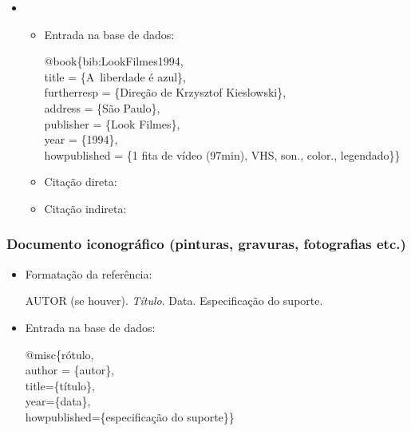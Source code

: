 \documentclass[a4paper,12pt,oneside,onecolumn]{uerj}
\newcommand{\formato}[1]{\begin{flushleft}{#1}\end{flushleft}}
\begin{document}
\begin{itemize}[label={Ex.:},leftmargin=\parindent,parsep=0pt,itemsep=0pt]
  \item     \formato{\citetext{bib:LookFilmes1994}}

  \begin{itemize}[leftmargin=*,parsep=0pt,itemsep=0pt]
    \item Entrada na base de dados:

    \formato{
      @book\{bib:LookFilmes1994,\\
      title = \{A~liberdade {\'e} azul\},\\
      furtherresp = \{Dire{\c c}{\~a}o de Krzysztof Kieslowski\},\\
      address = \{S{\~a}o Paulo\},\\
      publisher = \{Look Filmes\},\\
      year = \{1994\},\\
      howpublished = \{1 fita de vídeo (97min), VHS, son., color., legendado\}\}\\
    }

    \item Citação direta: 
    \item Citação indireta: \cite{bib:LookFilmes1994}
  \end{itemize}
\end{itemize}

\subsubsection{Documento iconográfico (pinturas, gravuras, fotografias etc.)}

\begin{itemize}[leftmargin=\parindent,parsep=0pt,itemsep=0pt]
  \item Formatação da referência:

    \formato{AUTOR (se houver). \textsl{Título}. Data. Especificação 
    do suporte.}

  \item Entrada na base de dados:

    \formato{
      @misc\{rótulo,\\
      author = \{autor\},\\
      title=\{título\},\\
      year=\{data\},\\
      howpublished=\{especificação do suporte\}\}\\
    }
\end{itemize}
\end{document}
